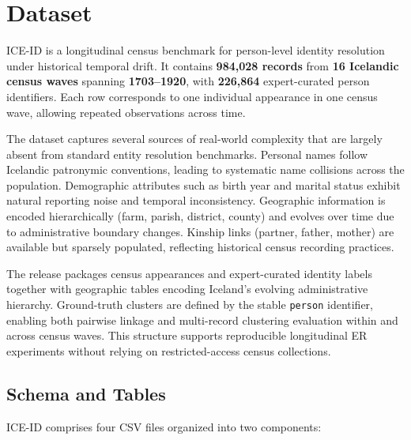 \documentclass{article}
\begin{document}

\section{Dataset}
\label{sec:dataset}

ICE-ID is a longitudinal census benchmark for person-level identity resolution under historical temporal drift. It contains \textbf{984,028 records} from \textbf{16 Icelandic census waves} spanning \textbf{1703--1920}, with \textbf{226,864} expert-curated person identifiers. Each row corresponds to one individual appearance in one census wave, allowing repeated observations across time.

The dataset captures several sources of real-world complexity that are largely absent from standard entity resolution benchmarks. Personal names follow Icelandic patronymic conventions, leading to systematic name collisions across the population. Demographic attributes such as birth year and marital status exhibit natural reporting noise and temporal inconsistency. Geographic information is encoded hierarchically (farm, parish, district, county) and evolves over time due to administrative boundary changes. Kinship links (partner, father, mother) are available but sparsely populated, reflecting historical census recording practices.

The release packages census appearances and expert-curated identity labels together with geographic tables encoding Iceland’s evolving administrative hierarchy. Ground-truth clusters are defined by the stable \texttt{person} identifier, enabling both pairwise linkage and multi-record clustering evaluation within and across census waves. This structure supports reproducible longitudinal ER experiments without relying on restricted-access census collections.


\subsection{Schema and Tables}

ICE-ID comprises four CSV files organized into two components:
\end{document}
